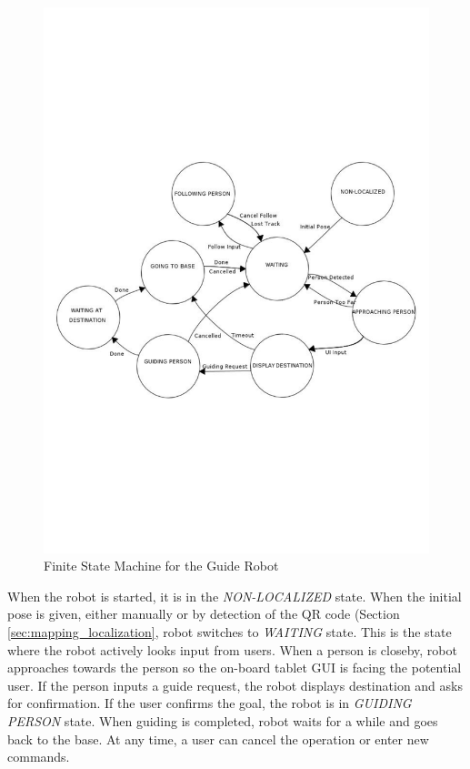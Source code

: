 \begin{figure}[ht!]
\centering
\includegraphics[width=1.0\textwidth]{pics/fsm}
\caption{Finite State Machine for the Guide Robot}
\label{fig:fsm}
\end{figure}

When the robot is started, it is in the \textit{NON-LOCALIZED} state. When the initial pose is given, either manually or by detection of the QR code (Section \ref{sec:mapping_localization}, robot switches to \textit{WAITING} state. This is the state where the robot actively looks input from users. When a person is closeby, robot approaches towards the person so the on-board tablet GUI is facing the potential user. If the person inputs a guide request, the robot displays destination and asks for confirmation. If the user confirms the goal, the robot is in \textit{GUIDING PERSON} state. When guiding is completed, robot waits for a while and goes back to the base. At any time, a user can cancel the operation or enter new commands.

